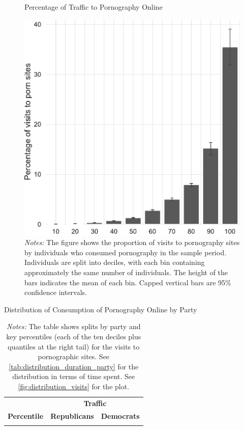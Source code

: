\documentclass[12pt,twoside]{article}
\begin{document}
\begin{figure}
	\centering
	\caption{Percentage of Traffic to Pornography Online}
	\includegraphics[width=.5\linewidth]{figs/distribution_proportion_visits_to_adultsites.pdf}
	\caption*{\footnotesize \emph{Notes:} 
		The figure shows the proportion of visits to pornography sites by individuals who consumed pornography in the sample period.
		Individuals are split into deciles, with each bin containing approximately the same number of individuals.
		The height of the bars indicates the mean of each bin.
		Capped vertical bars are 95\% confidence intervals.
	}
	\label{fig:distribution_prop_visits}
\end{figure}


\begin{table}[ht] \centering \small \setlength\tabcolsep{10 pt}
	\caption{Distribution of Consumption of Pornography Online by Party}
	\label{tab:distribution_visits_party}
	\begin{adjustbox}{max width=\textwidth}
		\begin{tabular}{crr}
			\toprule
			\multicolumn{1}{l}{\textbf{}}&\multicolumn{2}{c}{\textbf{Traffic}}\\
			\cmidrule(l){2-3}
			\multicolumn{1}{l}{\textbf{Percentile}}&\multicolumn{1}{c}{\textbf{Republicans}}&\multicolumn{1}{c}{\textbf{Democrats}}\\
			\midrule
            \\
			\bottomrule
		\end{tabular}
	\end{adjustbox}
	\caption*{\footnotesize \emph{Notes:} 
		The table shows splits by party and key percentiles (each of the ten deciles plus quantiles at the right tail) for the visits to pornographic sites.
		See \cref{tab:distribution_duration_party} for the distribution in terms of time spent. 
		See \cref{fig:distribution_visits} for the plot.
	}
\end{table}
\end{document}
